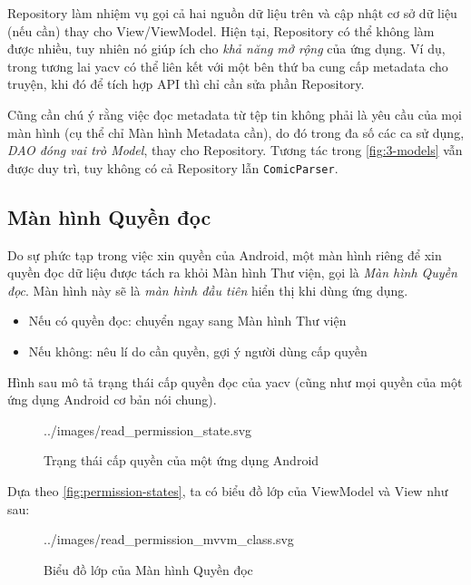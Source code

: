\documentclass[../../../../thesis]{subfiles}
\begin{document}
Repository làm nhiệm vụ gọi cả hai nguồn dữ liệu trên và cập nhật cơ sở dữ liệu
(nếu cần) thay cho View/ViewModel. Hiện tại, Repository có thể không làm được
nhiều, tuy nhiên nó giúp ích cho \emph{khả năng mở rộng} của ứng dụng. Ví dụ,
trong tương lai yacv có thể liên kết với một bên thứ ba cung cấp metadata cho
truyện, khi đó để tích hợp API thì chỉ cần sửa phần Repository.

Cũng cần chú ý rằng việc đọc metadata từ tệp tin không phải là yêu cầu của mọi
màn hình (cụ thể chỉ Màn hình Metadata cần), do đó trong đa số các ca sử dụng,
\emph{DAO đóng vai trò Model}, thay cho Repository. Tương tác trong
\autoref{fig:3-models} vẫn được duy trì, tuy không có cả Repository lẫn
\texttt{ComicParser}.



\subsection{Màn hình Quyền đọc}\label{sec:permission-design}

Do sự phức tạp trong việc xin quyền của Android, một màn hình riêng để xin quyền
đọc dữ liệu được tách ra khỏi Màn hình Thư viện, gọi là \emph{Màn hình Quyền
đọc}. Màn hình này sẽ là \emph{màn hình đầu tiên} hiển thị khi dùng ứng dụng.

\begin{itemize}
    \item
        Nếu có quyền đọc: chuyển ngay sang Màn hình Thư viện
    \item
        Nếu không: nêu lí do cần quyền, gợi ý người dùng cấp quyền
\end{itemize}

Hình sau mô tả trạng thái cấp quyền đọc của yacv (cũng như mọi quyền của một ứng
dụng Android cơ bản nói chung).

\begin{figure}[H]
    \centering
    
        {../images/read_permission_state.svg}
    \caption{Trạng thái cấp quyền của một ứng dụng Android}
    \label{fig:permission-states}
\end{figure}

Dựa theo \autoref{fig:permission-states}, ta có biểu đồ lớp của ViewModel và
View như sau:

\begin{figure}[H]
    \centering
    
        {../images/read_permission_mvvm_class.svg}
    \caption{Biểu đồ lớp của Màn hình Quyền đọc}
    \label{fig:read_permission_mvvm_class}
\end{figure}
\end{document}
